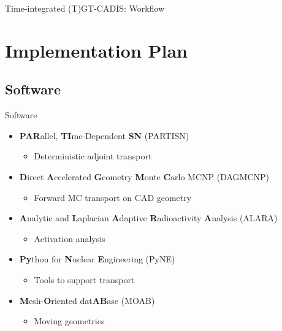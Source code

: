 \documentclass{beamer}
\begin{document}
\begin{frame}{Time-integrated (T)GT-CADIS: Workflow}
\begin{figure}
{
	}%
\end{figure}


\end{frame}


\section{Implementation Plan}

\subsection{Software}
\begin{frame}{Software}
	\begin{itemize}
		\item{\textbf{PAR}allel, \textbf{TI}me-Dependent \textbf{SN}
			(PARTISN) \cite{partisn}}
		   \begin{itemize}
		   \item{Deterministic adjoint transport}
		   \end{itemize}
		\item{\textbf{D}irect \textbf{A}ccelerated \textbf{G}eometry 
			\textbf{M}onte \textbf{C}arlo MCNP (DAGMCNP)
			\cite{dagmc}}
		   \begin{itemize}
		   \item{Forward MC transport on CAD geometry}
		   \end{itemize}
		\item{\textbf{A}nalytic and \textbf{L}aplacian \textbf{A}daptive 
			\textbf{R}adioactivity \textbf{A}nalysis (ALARA)
			\cite{alara}}
		   \begin{itemize}
		   \item{Activation analysis}
		   \end{itemize}
		\item{\textbf{Py}thon for \textbf{N}uclear \textbf{E}ngineering
			(PyNE) \cite{pyne}}
		   \begin{itemize}
		   \item{Tools to support transport}
		   \end{itemize}
		\item{\textbf{M}esh-\textbf{O}riented dat\textbf{AB}ase (MOAB)
			\cite{moab}}
		   \begin{itemize}
		   \item{Moving geometries}
		   \end{itemize}
	\end{itemize}
\end{frame}
\end{document}

